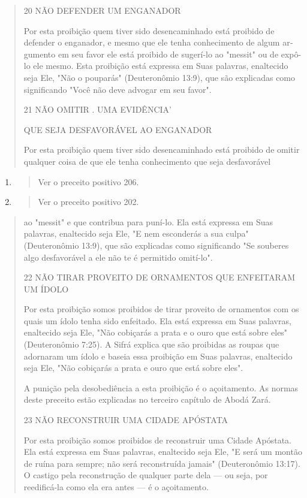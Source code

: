 \begin{quote}
20 NÃO DEFENDER UM ENGANADOR

Por esta proibição quem tiver sido desencaminhado está proibido de
defender o enganador, e mesmo que ele tenha conhecimento de algum
ar­gumento em seu favor ele está proibido de sugerí-lo ao "messit" ou de
expô-lo ele mesmo. Esta proibição está expressa em Suas palavras,
enaltecido seja Ele, "Não o pouparás" (Deuteronômio 13:9), que são
explicadas como significan­do "Você não deve advogar em seu favor".

21 NÃO OMITIR . UMA EVIDÊNCIA'

QUE SEJA DESFAVORÁVEL AO ENGANADOR

Por esta proibição quem tiver sido desencaminhado está proibido de
omitir qualquer coisa de que ele tenha conhecimento que seja
desfavorável
\end{quote}

\begin{enumerate}
\def\labelenumi{\arabic{enumi}.}
\setcounter{enumi}{241}
\item
  \begin{quote}
  Ver o preceito positivo 206.
  \end{quote}
\item
  \begin{quote}
  Ver o preceito positivo 202.
  \end{quote}
\end{enumerate}

\begin{quote}ao "messit" e que contribua para puní-lo. Ela está expressa em Suas
palavras, enaltecido seja Ele, "E nem esconderás a sua culpa"
(Deuteronômio 13:9), que são explicadas como significando "Se souberes
algo desfavorável a ele não te é permitido omití-lo".

22 NÃO TIRAR PROVEITO DE ORNAMENTOS QUE ENFEITARAM UM ÍDOLO

Por esta proibição somos proibidos de tirar proveito de ornamentos com
os quais um ídolo tenha sido enfeitado. Ela está expressa em Suas
pala­vras, enaltecido seja Ele, "Não cobiçarás a prata e o ouro que está
sobre eles" (Deuteronômio 7:25). A Sifrá explica que são proibidas as
roupas que adorna­ram um ídolo e baseia essa proibição em Suas palavras,
enaltecido seja Ele, "Não cobiçarás a prata e ouro que está sobre eles".

A punição pela desobediência a esta proibição é o açoitamento. As normas
deste preceito estão explicadas no terceiro capítulo de Abodá Zará.

23 NÃO RECONSTRUIR UMA CIDADE APÓSTATA

Por esta proibição somos proibidos de reconstruir uma Cidade Após­tata.
Ela está expressa em Suas palavras, enaltecido seja Ele, "E será um
montão de ruína para sempre; não será reconstruída jamais" (Deuteronômio
13:17). O castigo pela reconstrução de qualquer parte dela --- ou seja,
por reedificá-la co­mo ela era antes --- é o açoitamento.
\end{quote}

